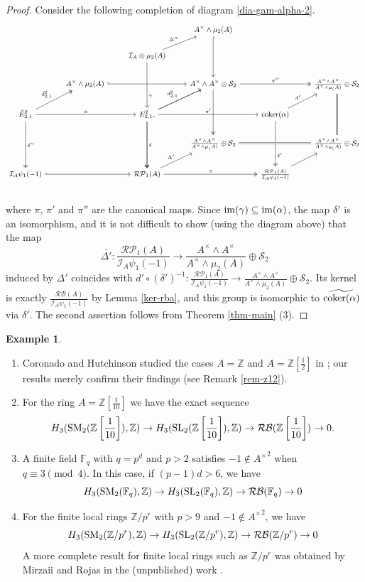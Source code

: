\documentclass[11pt]{amsart}
\theoremstyle{definition}
\theoremstyle{plain}
\theoremstyle{definition}
\newtheorem{exm}[ntn]{Example}
\numberwithin{equation}{section}
\newcommand{\z}{\mathbb{Z}}
\newcommand{\F}{\mathbb{F}}
\newcommand{\II}{\mathcal{I}}
\newcommand{\RP}{\mathcal{RP}}
\newcommand{\RB}{\mathcal{RB}}
\renewcommand{\SS}{\mathcal{S}}
\renewcommand{\aa}{{A^\times}}
\newcommand{\half}{{\left[\frac{1}{2}\right]}}
\newcommand{\mth}[1]{\left[ \frac{1}{#1} \right]}
\newcommand{\SL}{\mathit{{\rm SL}}}
\newcommand{\SM}{\mathit{{\rm SM}}}
\newcommand{\im}{{\rm im}}
\newcommand{\coker}{{\rm coker}}
\begin{document}
	\begin{proof}
		Consider the following completion of diagram \eqref{dia-gam-alpha-2}.
		\[
		{\small
			\begin{tikzcd}
				& & & \aa\wedge\mu_2(A)\ar[dd,hook] & &\\
				& & \II_A\otimes\mu_2(A)\ar[ru,"\Delta''"]\ar[dd,"\gamma" near end] & & &\\
				& \aa\wedge\mu_2(A)\ar[rr,hook] & & \aa\wedge\aa\oplus\SS_2\ar[rr,twoheadrightarrow,"\pi''"]\ar[dd,twoheadrightarrow] & & \frac{\aa\wedge\aa}{\aa\wedge\mu_(A)}\oplus\SS_2\ar[dd,equal]\\
				\hat{E}^2_{2,1}\ar[ru,twoheadrightarrow,"\hat{d}^2_{2,1}"]\ar[rr,"\alpha"]\ar[dd,twoheadrightarrow,"\delta''"] & & E^2_{2,1}\ar[ru,"d^2_{2,1}"]\ar[dd,twoheadrightarrow,"\delta"],\ar[rr,"\pi'"]\ar[ru]\ar[dd,twoheadrightarrow] & & \coker(\alpha)\ar[ru,"d'"]\ar[dd,twoheadrightarrow,"\delta'" near end] &\\
				& & & \frac{\aa\wedge\aa}{\aa\wedge\mu_(A)}\oplus\SS_2\ar[rr,equal] & & \frac{\aa\wedge\aa}{\aa\wedge\mu_(A)}\oplus\SS_2\\
				\II_A\psi_1(-1)\ar[rr,hook] & & \RP_1(A)\ar[rr,twoheadrightarrow,"\pi"]\ar[ru,"\Delta'"] & & \frac{\RP_1(A)}{\II_A\psi_1(-1)}\ar[ru] &\\
			\end{tikzcd}
		}
		\]
		where $\pi$, $\pi'$ and $\pi''$ are the canonical maps. Since $\im(\gamma)\subseteq\im(\alpha)$, the map $\delta'$ is an isomorphism, and it is not difficult to show (using the diagram above) that the map
		\[
		\bar{\Delta'}:\frac{\RP_1(A)}{\II_A\psi_1(-1)}\to\frac{\aa\wedge\aa}{\aa\wedge\mu_2(A)}\oplus\SS_2
		\]
		induced by $\Delta'$ coincides with $d'\circ(\delta')^{-1}:\frac{\RP_1(A)}{\II_A\psi_1(-1)}\to\frac{\aa\wedge\aa}{\aa\wedge\mu_2(A)}\oplus\SS_2$. Its kernel is exactly $\frac{\RB(A)}{\II_A\psi_1(-1)}$ by Lemma \ref{ker-rba}, and this group is isomorphic to $\widetilde{\coker(\alpha)}$ via $\delta'$.
		The second assertion follows from Theorem \ref{thm-main} (3).
	\end{proof}
	\begin{exm}
		\begin{enumerate}
			\item Coronado and Hutchinson studied the cases $A=\z$ and $A=\z\half$ in \cite[\S 8]{C-H2022}; our results merely confirm their findings (see Remark \ref{rem-z12}). 
			\item For the ring $A=\z\mth{10}$ we have the exact sequence
			\[
			H_3(\SM_2(\z\mth{10}),\z)\to H_3(\SL_2(\z\mth{10}),\z)\to \RB(\z\mth{10})\to 0.
			\]
			\item A finite field $\F_q$ with $q=p^d$ and $p>2$ satisfies $-1\notin \aa^2$ when $q\equiv 3 \pmod 4$. In this case, if $(p-1)d>6$, we have 
			\[
			H_3(\SM_2(\F_q),\z)\to H_3(\SL_2(\F_q),\z)\to \RB(\F_q)\to 0
			\]
			\item For the finite local rings $\z/p^r$ with $p>9$ and $-1\notin\aa^2$, we have
			\[
			H_3(\SM_2(\z/p^r),\z)\to H_3(\SL_2(\z/p^r),\z)\to \RB(\z/p^r)\to 0
			\]
			A more complete result for finite local rings such as $\z/p^r$ was obtained by Mirzaii and Rojas in the (unpublished) work \cite[Theorem 6.2]{B-R--2025}.
		\end{enumerate}
	\end{exm}
\end{document}
